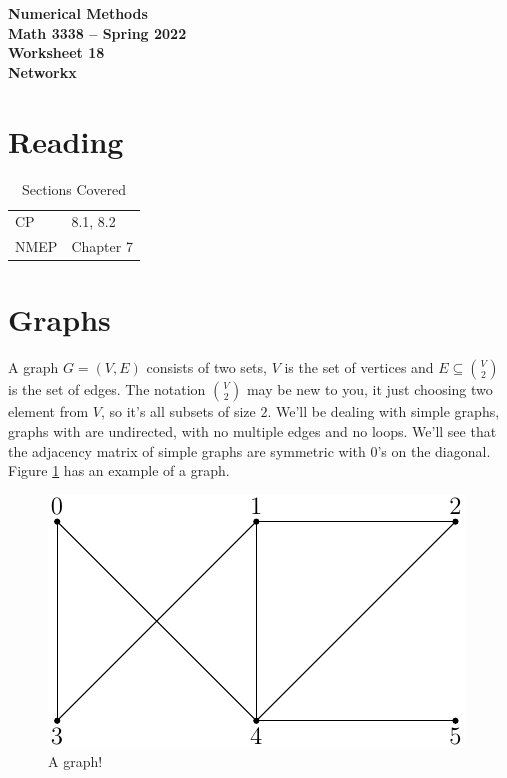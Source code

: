 \documentclass[11pt,letterpaper]{article}
\newcommand{\semester}{Spring 2022}
\begin{document}
\begin{center}
{\huge{\bf  Numerical Methods}} \\[1.5ex]
{\bf Math 3338 -- \semester}\\[1.5ex]
{\Large{\bf Worksheet 18 \\[2ex] Networkx}}\\
\end{center}
\vspace{2mm}


\section{Reading}

\begin{table}[!ht]
 \centering
 \begin{tabular}{ll}
   CP &  8.1, 8.2 \\
 NMEP &  Chapter 7
 \end{tabular}
\caption{Sections Covered}
\end{table}






\section{Graphs}
A graph $G=(V,E)$ consists of two sets, $V$ is the set of vertices and $E\subseteq\binom{V}{2}$ is
the set of edges. The notation $\binom{V}{2}$ may be new to you, it just choosing two element from
$V$, so it's all subsets of size $2$. We'll be dealing with simple graphs, graphs with are
undirected, with no multiple edges and no loops. We'll see that the adjacency matrix of simple
graphs are symmetric with 0's on the diagonal. Figure \ref{fig:exa_graph} has an example of a graph.

\begin{figure}[!ht]
 \centering
 \includegraphics{images/exa_graph.pdf}
 \caption{A graph!}
 \label{fig:exa_graph}  
\end{figure}
\end{document}
